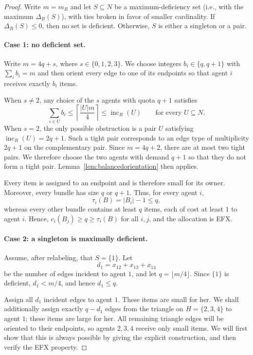 \documentclass{article}
\theoremstyle{definition}
\begin{document}
\begin{proof}
Write $m=m_R$ and let $S\subseteq N$ be a maximum-deficiency set (i.e., with the maximum $\Delta_R(S)$), with ties broken in favor of smaller cardinality.  If $\Delta_R(S)\le 0$, then no set is deficient.  Otherwise, $S$ is either a singleton or a pair.

\paragraph{Case 1: no deficient set.}
Write $m=4q+s$, where $s\in\{0,1,2,3\}$.  We choose integers
$b_i\in\{q,q+1\}$ with $\sum_i b_i=m$ and then orient every edge to one of
its endpoints so that agent $i$ receives exactly $b_i$ items.

When $s\neq 2$, any choice of the $s$ agents with quota $q+1$ satisfies
\[
 \sum_{i\in U}b_i\le
 \left\lceil\frac{|U|m}{4}\right\rceil
 \le \operatorname{inc}_R(U)
 \qquad\text{for every }U\subseteq N.
\]
When $s=2$, the only possible obstruction is a pair $U$ satisfying
$\operatorname{inc}_R(U)=2q+1$.  Such a tight pair corresponds to an edge
type of multiplicity $2q+1$ on the complementary pair.  Since
$m=4q+2$, there are at most two tight pairs.  We therefore choose the two
agents with demand $q+1$ so that they do not form a tight pair.  Lemma~\ref{lem:balancedorientation} then applies.

Every item is assigned to an endpoint and is therefore small for its owner.
Moreover, every bundle has size $q$ or $q+1$.  Thus, for every agent $i$,
\[
 \tau_i(B)=|B_i|-1\le q,
\]
whereas every other bundle contains at least $q$ items, each of cost at least
$1$ to agent $i$.  Hence, $c_i(B_j)\ge q\ge \tau_i(B)$ for all $i,j$, and the
allocation is EFX.

\paragraph{Case 2: a singleton is maximally deficient.}
Assume, after relabeling, that $S=\{1\}$.  Let
\[
 d_1=x_{12}+x_{13}+x_{14}
\]
be the number of edges incident to agent $1$, and let $q=\lfloor m/4\rfloor$.
Since $\{1\}$ is deficient, $d_1<m/4$, and hence $d_1\le q$.

Assign all $d_1$ incident edges to agent $1$.  These items are small for her.
We shall additionally assign exactly $q-d_1$ edges from the triangle on
$H=\{2,3,4\}$ to agent $1$; these items are large for her.  All remaining
triangle edges will be oriented to their endpoints, so agents $2,3,4$ receive
only small items.
We will first show that this is always possible by giving the explicit construction, and then verify the EFX property.


\end{proof}
\end{document}
